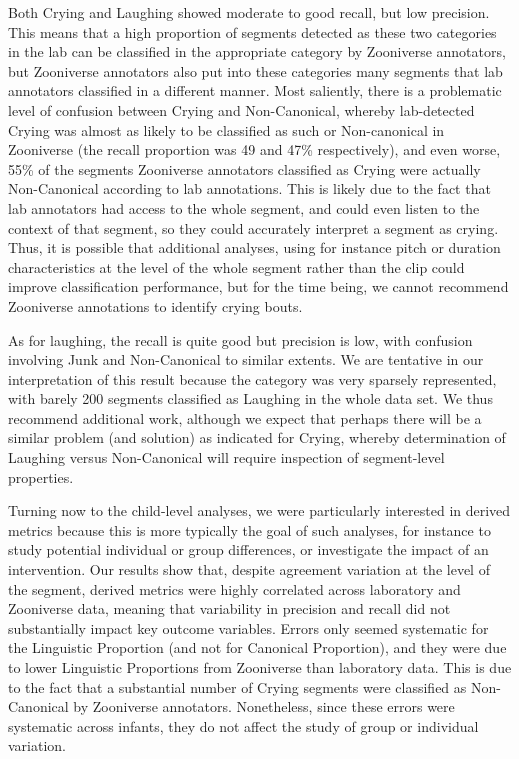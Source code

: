 \documentclass[english,,man,floatsintext]{apa6}
\begin{document}
Both Crying and Laughing showed moderate to good recall, but low precision. This means that a high proportion of segments detected as these two categories in the lab can be classified in the appropriate category by Zooniverse annotators, but Zooniverse annotators also put into these categories many segments that lab annotators classified in a different manner. Most saliently, there is a problematic level of confusion between Crying and Non-Canonical, whereby lab-detected Crying was almost as likely to be classified as such or Non-canonical in Zooniverse (the recall proportion was 49 and 47\% respectively), and even worse, 55\% of the segments Zooniverse annotators classified as Crying were actually Non-Canonical according to lab annotations. This is likely due to the fact that lab annotators had access to the whole segment, and could even listen to the context of that segment, so they could accurately interpret a segment as crying. Thus, it is possible that additional analyses, using for instance pitch or duration characteristics at the level of the whole segment rather than the clip could improve classification performance, but for the time being, we cannot recommend Zooniverse annotations to identify crying bouts.

As for laughing, the recall is quite good but precision is low, with confusion involving Junk and Non-Canonical to similar extents. We are tentative in our interpretation of this result because the category was very sparsely represented, with barely 200 segments classified as Laughing in the whole data set. We thus recommend additional work, although we expect that perhaps there will be a similar problem (and solution) as indicated for Crying, whereby determination of Laughing versus Non-Canonical will require inspection of segment-level properties.

Turning now to the child-level analyses, we were particularly interested in derived metrics because this is more typically the goal of such analyses, for instance to study potential individual or group differences, or investigate the impact of an intervention. Our results show that, despite agreement variation at the level of the segment, derived metrics were highly correlated across laboratory and Zooniverse data, meaning that variability in precision and recall did not substantially impact key outcome variables. Errors only seemed systematic for the Linguistic Proportion (and not for Canonical Proportion), and they were due to lower Linguistic Proportions from Zooniverse than laboratory data. This is due to the fact that a substantial number of Crying segments were classified as Non-Canonical by Zooniverse annotators. Nonetheless, since these errors were systematic across infants, they do not affect the study of group or individual variation.
\end{document}
